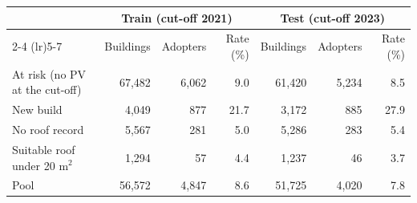 \begin{tabular}{lrrrrrr}
\toprule
 & \multicolumn{3}{c}{Train (cut-off 2021)} & \multicolumn{3}{c}{Test (cut-off 2023)} \\
\cmidrule(lr){2-4} \cmidrule(lr){5-7}
 & Buildings & Adopters & Rate (\%) & Buildings & Adopters & Rate (\%) \\
\midrule
At risk (no PV at the cut-off) & 67{,}482 & 6{,}062 & 9.0 & 61{,}420 & 5{,}234 & 8.5 \\
\midrule
New build & 4{,}049 & 877 & 21.7 & 3{,}172 & 885 & 27.9 \\
No roof record & 5{,}567 & 281 & 5.0 & 5{,}286 & 283 & 5.4 \\
Suitable roof under 20 m$^2$ & 1{,}294 & 57 & 4.4 & 1{,}237 & 46 & 3.7 \\
Pool & 56{,}572 & 4{,}847 & 8.6 & 51{,}725 & 4{,}020 & 7.8 \\
\bottomrule
\end{tabular}
